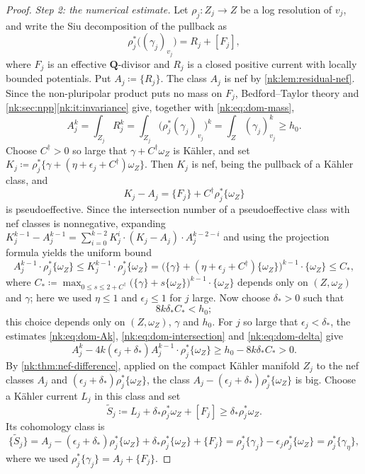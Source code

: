 \begin{proof}
\emph{Step 2: the numerical estimate.}
Let $\rho_j\colon Z_j\to Z$ be a log resolution of $v_j$, and write
the Siu decomposition of the pullback as
\[
  \rho_j^*\bigl((\gamma_j)_{v_j}\bigr)=R_j+[F_j],
\]
where $F_j$ is an effective $\mathbf Q$-divisor and $R_j$ is a closed
positive current with locally bounded potentials. Put $A_j\coloneqq \{R_j\}$.
The class $A_j$ is nef by \cref{nk:lem:residual-nef}. Since the
non-pluripolar product puts no mass on $F_j$, Bedford--Taylor theory and
\cref{nk:sec:npp}\ref{nk:it:invariance} give, together with
\eqref{nk:eq:dom-mass},
\begin{equation}\label{nk:eq:dom-Ak}
  A_j^k=\int_{Z_j}R_j^k
  =\int_{Z_j}\bigl(\rho_j^*(\gamma_j)_{v_j}\bigr)^k
  =\int_Z(\gamma_j)_{v_j}^k\ge h_0.
\end{equation}
Choose $C^\dagger>0$ so large that $\gamma+C^\dagger\omega_Z$ is
K\"ahler, and set
$K_j\coloneqq \rho_j^*\{\gamma+(\eta+\epsilon_j+C^\dagger)\omega_Z\}$. Then
$K_j$ is nef, being the pullback of a K\"ahler class, and
\[
  K_j-A_j=\{F_j\}+C^\dagger\rho_j^*\{\omega_Z\}
\]
is pseudoeffective. Since the intersection number of a pseudoeffective
class with nef classes is nonnegative, expanding
$K_j^{k-1}-A_j^{k-1}=\sum_{i=0}^{k-2}K_j^i\cdot(K_j-A_j)\cdot A_j^{k-2-i}$
and using the projection formula yields the uniform bound
\begin{equation}\label{nk:eq:dom-intersection}
  A_j^{k-1}\cdot\rho_j^*\{\omega_Z\}
  \le K_j^{k-1}\cdot\rho_j^*\{\omega_Z\}
  =\bigl(\{\gamma\}+(\eta+\epsilon_j+C^\dagger)\{\omega_Z\}\bigr)^{k-1}
   \cdot\{\omega_Z\}
  \le C_*,
\end{equation}
where
$C_*\coloneqq \max_{0\le s\le 2+C^\dagger}\bigl(\{\gamma\}+s\{\omega_Z\}\bigr)^{k-1}\cdot\{\omega_Z\}$
depends only on $(Z,\omega_Z)$ and $\gamma$; here we used
$\eta\le1$ and $\epsilon_j\le1$ for $j$ large. Now choose
$\delta_*>0$ such that
\begin{equation}\label{nk:eq:dom-delta}
  8k\delta_*C_*<h_0;
\end{equation}
this choice depends only on $(Z,\omega_Z)$, $\gamma$ and $h_0$. For
$j$ so large that $\epsilon_j<\delta_*$, the estimates
\eqref{nk:eq:dom-Ak}, \eqref{nk:eq:dom-intersection} and \eqref{nk:eq:dom-delta}
give
\[
  A_j^k-4k(\epsilon_j+\delta_*)A_j^{k-1}\cdot\rho_j^*\{\omega_Z\}
  \ge h_0-8k\delta_*C_*>0.
\]
By \cref{nk:thm:nef-difference}, applied on the compact K\"ahler manifold
$Z_j$ to the nef classes $A_j$ and
$(\epsilon_j+\delta_*)\rho_j^*\{\omega_Z\}$, the class
$A_j-(\epsilon_j+\delta_*)\rho_j^*\{\omega_Z\}$
is big. Choose a K\"ahler current $L_j$ in this class and set
\[
  \widetilde S_j\coloneqq L_j+\delta_*\rho_j^*\omega_Z+[F_j]
  \ge\delta_*\rho_j^*\omega_Z .
\]
Its cohomology class is
\[
  \{\widetilde S_j\}
  =A_j-(\epsilon_j+\delta_*)\rho_j^*\{\omega_Z\}
     +\delta_*\rho_j^*\{\omega_Z\}+\{F_j\}
  =\rho_j^*\{\gamma_j\}-\epsilon_j\rho_j^*\{\omega_Z\}
  =\rho_j^*\{\gamma_\eta\},
\]
where we used $\rho_j^*\{\gamma_j\}=A_j+\{F_j\}$.


\end{proof}
